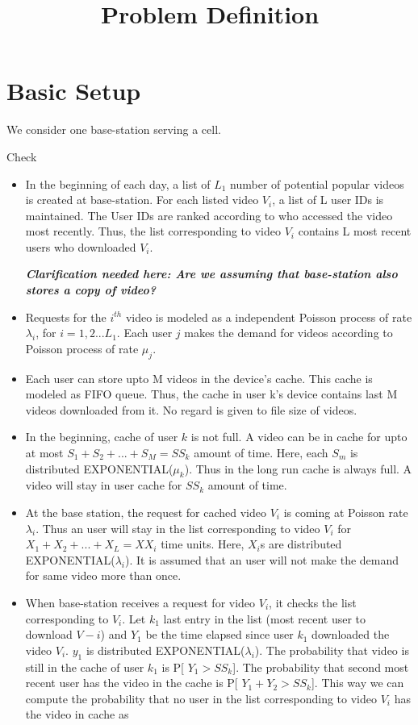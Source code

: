 \documentclass[12pt]{article}
\title{Problem Definition}
\begin{document}
\section*{Basic Setup}
 We consider one base-station serving a cell. 
 
Check
 
\begin{itemize}


\item In the beginning of each day, a list of $L_1$ number of potential popular videos is created at base-station. For each listed video $V_i$, a list of L user IDs is maintained. The User IDs are ranked according to who accessed the video most recently. Thus, the list   corresponding to video $V_i $ contains L most recent users who downloaded $V_i$.

\textbf{\textit{Clarification needed here: Are we assuming that base-station also stores a copy of  video?}}
 
\item Requests for the $i^{th}$ video is modeled as a independent Poisson process of rate $\lambda_{i}$, for $i = 1, 2...L_1$. Each user $j$ makes the demand for videos according to Poisson process of rate $\mu_j$. 
 
\item Each user can store upto M videos in the device's cache. This cache is modeled as FIFO queue. Thus, the cache in user k's device contains last M videos downloaded from it. No regard is given to file size of videos.  

\item In the beginning, cache of user $k$ is not full. A video can be in cache for upto at most $S_1 + S_2 + ... + S_M = SS_k$ amount of time. Here, each $S_m$  is distributed  EXPONENTIAL($\mu_k$). Thus in the long run cache is always full. A video will stay in user cache for $SS_k$ amount of time. 
 
\item At the base station, the request for cached video $V_i$  is coming at Poisson rate $\lambda_i$. Thus an user will stay in the list corresponding to video $V_i$ for $X_1 + X_2 + ... + X_L = XX_i$ time units. Here, $X_i$s are distributed EXPONENTIAL($\lambda_i$). It is assumed that an user will not make the demand for same video more than once. 

\item When base-station receives a request for video $V_i$, it checks the list corresponding to $V_i$. Let $k_1$ last entry in the list (most recent user to download $V-i$) and $Y_1$ be the time elapsed since user $k_1$ downloaded the video $V_i$. $y_1$ is distributed EXPONENTIAL($\lambda_i$). The probability that video is still in the cache of user $k_1$ is P[ $Y_1 > SS_k$]. The probability that second most recent user has the video in the cache is P[ $Y_1 + Y_2 > SS_k$]. This way we can compute the probability that no user in the list corresponding to video $V_i$ has the video in cache as 


\end{itemize}
\end{document}
